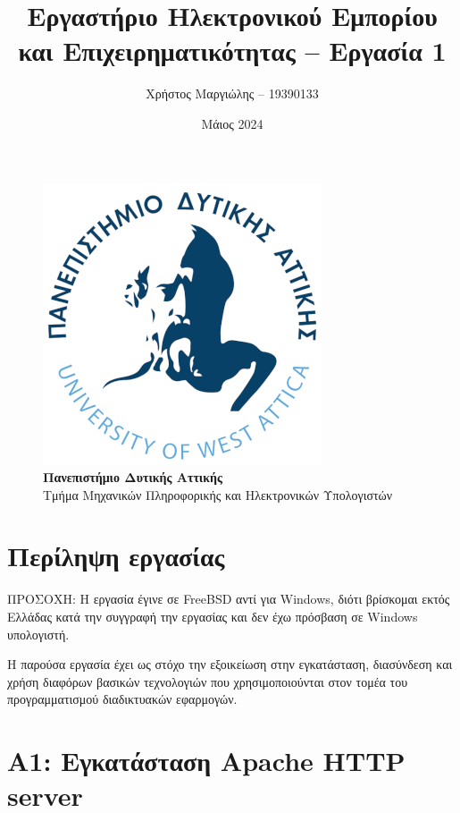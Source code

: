 \documentclass[12pt]{article}
\title{Εργαστήριο Ηλεκτρονικού Εμπορίου και Επιχειρηματικότητας -- Εργασία 1}
\author{Χρήστος Μαργιώλης -- 19390133}
\date{Μάιος 2024}
\begin{document}
\begin{titlepage}
        \maketitle
        \begin{figure}[t!]
        \begin{center}
        \includegraphics[scale=0.3]{./res/uniwalogo.png} \\
        \Large
        \textbf{Πανεπιστήμιο Δυτικής Αττικής} \\
        \large
        Τμήμα Μηχανικών Πληροφορικής και Ηλεκτρονικών Υπολογιστών
        \end{center}
        \end{figure}
\end{titlepage}

\renewcommand{\contentsname}{Περιεχόμενα}
\tableofcontents
\pagebreak


\section{Περίληψη εργασίας}

ΠΡΟΣΟΧΗ: Η εργασία έγινε σε FreeBSD αντί για Windows, διότι βρίσκομαι εκτός Ελλάδας κατά την συγγραφή την
εργασίας και δεν έχω πρόσβαση σε Windows υπολογιστή.

Η παρούσα εργασία έχει ως στόχο την εξοικείωση στην εγκατάσταση, διασύνδεση και
χρήση διαφόρων βασικών τεχνολογιών που χρησιμοποιούνται στον τομέα του
προγραμματισμού διαδικτυακών εφαρμογών.

\section{Α1: Εγκατάσταση Apache HTTP server}
\end{document}
